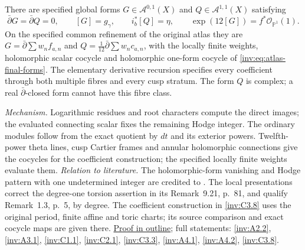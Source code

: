 There are specified global forms
$G\in\mathcal A^{0,1}(X)$ and $Q\in\mathcal A^{1,1}(X)$ satisfying
\[
 \bar\partial G=\bar\partial Q=0,\qquad
 [G]=g_\gamma,\qquad i_b^*[Q]=\eta,\qquad
 \exp(12[G])=f^*\mathcal O_{\mathbb P^1}(1).
\]
On the specified common refinement of the original atlas they are
$G=\bar\partial\sum w_nf_{a,n}$ and
$Q=\tfrac1{12}\bar\partial\sum w_nc_{a,n}$, with the locally finite
weights, holomorphic scalar cocycle and holomorphic one-form cocycle
of \eqref{inv:eq:atlas-final-forms}.  The elementary derivative
recursion specifies every coefficient through both multiple fibres
and every cusp stratum.  The form $Q$ is complex; a real
$\bar\partial$-closed form cannot have this fibre class.

\textit{Mechanism.} Logarithmic residues and root characters
compute the direct images; the evaluated connecting scalar fixes
the remaining Hodge integer.  The ordinary modules follow from
the exact quotient by $dt$ and its exterior powers.
Twelfth-power theta lines, cusp Cartier frames and annular
holomorphic connections give the cocycles for the coefficient
construction; the specified locally finite weights evaluate them.
\textit{Relation to literature.} The holomorphic-form vanishing
and Hodge pattern with one undetermined integer are credited to
\cite[Theorem~9.1(vi), p.~65; Proposition~9.20, p.~80]{AC2026}.
The local presentations correct the degree-one torsion assertion
in its Remark~9.21, p.~81, and qualify Remark~1.3, p.~5, by
degree.  The coefficient construction in \ref{inv:C3.8} uses the
original period, finite affine and toric charts; its source comparison
and exact cocycle maps are given there.
\hyperlink{outline-I-D}{Proof in outline}; full statements:
\ref{inv:A2.2}, \ref{inv:A3.1}, \ref{inv:C1.1},
\ref{inv:C2.1}, \ref{inv:C3.3}, \ref{inv:A4.1},
\ref{inv:A4.2}, \ref{inv:C3.8}.

\hypertarget{main-I-E}{}
